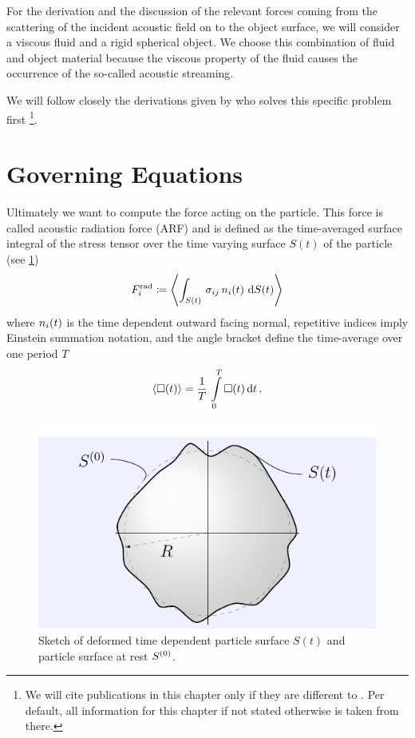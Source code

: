 For the derivation and the discussion of the relevant forces coming from the 
scattering of the incident acoustic field on to the object surface, we will 
consider a viscous fluid and a rigid spherical object. We choose this 
combination of fluid and object material because the viscous property of the 
fluid causes the occurrence of the so-called acoustic streaming.

We will follow closely the derivations given by  who 
solves this specific problem first \footnote{We will cite publications in this 
chapter only if they are different to . Per default, 
all information for this chapter if not stated otherwise is taken from there.}.

\section{Governing Equations}

Ultimately we want to compute the force acting on the particle. This force is 
called acoustic radiation force (ARF) and is defined as the time-averaged 
surface integral of the stress tensor over the time varying surface $S(t)$ of 
the particle (see \cref{fig:TA-deformed_circle})
\begin{equation}
  F^{\mathrm{rad}}_{i} \coloneqq
  \left\langle \int_{S(t)}\,\sigma_{ij}\,n_{i}(t)\,\dd{S(t)} \right\rangle
  \label{eq:TA-def-rad}
\end{equation}
where $n_{i}(t)$ is the time dependent outward facing normal, repetitive 
indices imply Einstein summation notation, and the angle bracket define the 
time-average over one period $T$
\begin{equation}
  \left\langle \Box(t) \right\rangle = \frac{1}{T}\,\int\limits_{0}^{T}\Box(t)\dd{t}.
  \label{eq:TA-time-average}
\end{equation}

\begin{figure}[tbp]
  \centering
  \includegraphics[]{Plots/cache/deformed_circle.pdf}
  \caption{Sketch of deformed time dependent particle surface $S(t)$ and 
  particle surface at rest $S^{(0)}$.}
  \label{fig:TA-deformed_circle}
\end{figure}

